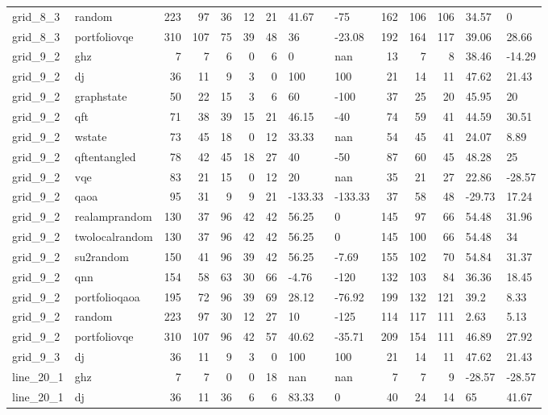 \begin{longtable}{llrrrrrllrrrll}
grid\_8\_3 & random & 223 & 97 & 36 & 12 & 21 & 41.67 & -75 & 162 & 106 & 106 & 34.57 & 0 \\
grid\_8\_3 & portfoliovqe & 310 & 107 & 75 & 39 & 48 & 36 & -23.08 & 192 & 164 & 117 & 39.06 & 28.66 \\
grid\_9\_2 & ghz & 7 & 7 & 6 & 0 & 6 & 0 & nan & 13 & 7 & 8 & 38.46 & -14.29 \\
grid\_9\_2 & dj & 36 & 11 & 9 & 3 & 0 & 100 & 100 & 21 & 14 & 11 & 47.62 & 21.43 \\
grid\_9\_2 & graphstate & 50 & 22 & 15 & 3 & 6 & 60 & -100 & 37 & 25 & 20 & 45.95 & 20 \\
grid\_9\_2 & qft & 71 & 38 & 39 & 15 & 21 & 46.15 & -40 & 74 & 59 & 41 & 44.59 & 30.51 \\
grid\_9\_2 & wstate & 73 & 45 & 18 & 0 & 12 & 33.33 & nan & 54 & 45 & 41 & 24.07 & 8.89 \\
grid\_9\_2 & qftentangled & 78 & 42 & 45 & 18 & 27 & 40 & -50 & 87 & 60 & 45 & 48.28 & 25 \\
grid\_9\_2 & vqe & 83 & 21 & 15 & 0 & 12 & 20 & nan & 35 & 21 & 27 & 22.86 & -28.57 \\
grid\_9\_2 & qaoa & 95 & 31 & 9 & 9 & 21 & -133.33 & -133.33 & 37 & 58 & 48 & -29.73 & 17.24 \\
grid\_9\_2 & realamprandom & 130 & 37 & 96 & 42 & 42 & 56.25 & 0 & 145 & 97 & 66 & 54.48 & 31.96 \\
grid\_9\_2 & twolocalrandom & 130 & 37 & 96 & 42 & 42 & 56.25 & 0 & 145 & 100 & 66 & 54.48 & 34 \\
grid\_9\_2 & su2random & 150 & 41 & 96 & 39 & 42 & 56.25 & -7.69 & 155 & 102 & 70 & 54.84 & 31.37 \\
grid\_9\_2 & qnn & 154 & 58 & 63 & 30 & 66 & -4.76 & -120 & 132 & 103 & 84 & 36.36 & 18.45 \\
grid\_9\_2 & portfolioqaoa & 195 & 72 & 96 & 39 & 69 & 28.12 & -76.92 & 199 & 132 & 121 & 39.2 & 8.33 \\
grid\_9\_2 & random & 223 & 97 & 30 & 12 & 27 & 10 & -125 & 114 & 117 & 111 & 2.63 & 5.13 \\
grid\_9\_2 & portfoliovqe & 310 & 107 & 96 & 42 & 57 & 40.62 & -35.71 & 209 & 154 & 111 & 46.89 & 27.92 \\
grid\_9\_3 & dj & 36 & 11 & 9 & 3 & 0 & 100 & 100 & 21 & 14 & 11 & 47.62 & 21.43 \\
line\_20\_1 & ghz & 7 & 7 & 0 & 0 & 18 & nan & nan & 7 & 7 & 9 & -28.57 & -28.57 \\
line\_20\_1 & dj & 36 & 11 & 36 & 6 & 6 & 83.33 & 0 & 40 & 24 & 14 & 65 & 41.67 \\

\end{longtable}
